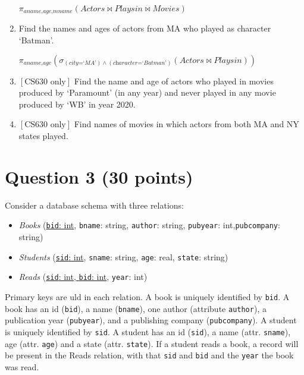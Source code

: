 \documentclass[letterpaper, 11pt]{article}
\begin{document}
\begin{enumerate}[label={\alph*})]
    $\pi_{\textit{aname,age,mname}}(\textit{Actors} \bowtie \textit{Playsin} \bowtie \textit{Movies})$
    
    \item Find the names and ages of actors from MA who played as character `Batman'.

    $\pi_{\textit{aname,age}}(\sigma_{(\textit{city=`MA'})\wedge (\textit{character=`Batman'})}(\textit{Actors} \bowtie \textit{Playsin}))$
    
    \item $\left[\text{CS630 only}\right]$ Find the name and age of actors who played in movies produced by `Paramount' (in any year) and never played in any movie produced by `WB' in year 2020.
    \item $\left[\text{CS630 only}\right]$ Find names of movies in which actors from both MA and NY states played.
\end{enumerate}

\section*{Question 3 (30 points)}

Consider a database schema with three relations:
\begin{itemize}
    \item \textit{Books} (\ul{\texttt{bid}: int}, \texttt{bname}: string, \texttt{author}: string, \texttt{pubyear}: int,\texttt{pubcompany}: string)
    \item \textit{Students} (\ul{\texttt{sid}: int}, \texttt{sname}: string, \texttt{age}: real, \texttt{state}: string)
    \item \textit{Reads} (\ul{\texttt{sid}: int, \texttt{bid}: int}, \texttt{year}: int)
\end{itemize}

Primary keys are uld  in each relation. A book is uniquely identified by \texttt{bid}. A book has an id (\texttt{bid}), a name (\texttt{bname}), one author (attribute \texttt{author}), a publication year (\texttt{pubyear}), and a publishing company (\texttt{pubcompany}). A student is uniquely identified by \texttt{sid}. A student has an id (\texttt{sid}), a name (attr. \texttt{sname}), age (attr. \texttt{age}) and a state (attr. \texttt{state}). If a student reads a book, a record will be present in the Reads relation, with that \texttt{sid} and \texttt{bid} and the \texttt{year} the book was read.
\end{document}
